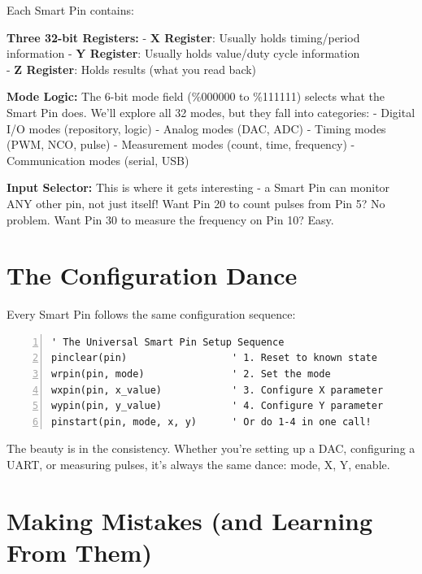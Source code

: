 \documentclass[11pt,a4paper,oneside,english]{book}
\begin{document}
Each Smart Pin contains:

\textbf{Three 32-bit Registers:} - \textbf{X Register}: Usually holds
timing/period information - \textbf{Y Register}: Usually holds
value/duty cycle information\\
- \textbf{Z Register}: Holds results (what you read back)

\textbf{Mode Logic:} The 6-bit mode field (\%000000 to \%111111) selects
what the Smart Pin does. We'll explore all 32 modes, but they fall into
categories: - Digital I/O modes (repository, logic) - Analog modes (DAC,
ADC) - Timing modes (PWM, NCO, pulse) - Measurement modes (count, time,
frequency) - Communication modes (serial, USB)

\textbf{Input Selector:} This is where it gets interesting - a Smart Pin
can monitor ANY other pin, not just itself! Want Pin 20 to count pulses
from Pin 5? No problem. Want Pin 30 to measure the frequency on Pin 10?
Easy.

\hypertarget{the-configuration-dance}{%
\section{The Configuration Dance}\label{the-configuration-dance}}

Every Smart Pin follows the same configuration sequence:

\begin{Spin2Block}
\begin{Verbatim}[numbers=left,numbersep=5pt,xleftmargin=15pt]
' The Universal Smart Pin Setup Sequence
pinclear(pin)                  ' 1. Reset to known state
wrpin(pin, mode)               ' 2. Set the mode
wxpin(pin, x_value)            ' 3. Configure X parameter
wypin(pin, y_value)            ' 4. Configure Y parameter  
pinstart(pin, mode, x, y)      ' Or do 1-4 in one call!
\end{Verbatim}
\end{Spin2Block}

The beauty is in the consistency. Whether you're setting up a DAC,
configuring a UART, or measuring pulses, it's always the same dance:
mode, X, Y, enable.

\hypertarget{making-mistakes-and-learning-from-them}{%
\section{Making Mistakes (and Learning From
Them)}\label{making-mistakes-and-learning-from-them}}
\end{document}
